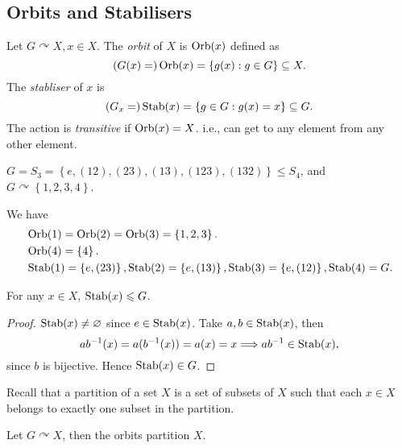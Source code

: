 \documentclass[a4paper]{article}
\begin{document}
        \subsection{Orbits and Stabilisers}
        \begin{definition}
            Let $ G \curvearrowright X, x\in X $. The \textit{orbit} of $X$ is $ \operatorname{Orb}(x) $ defined as 
            \[
                (G(x)=)\operatorname{Orb}(x)=\left\{ g(x):g\in G\right\} \subseteq X
            .\]
            The \textit{stabliser} of $x$ is 
            \[
                (G_x=)\operatorname{Stab}(x)=\left\{ g\in G: g(x)=x\right\} \subseteq G
            .\]
            The action is \textit{transitive} if $ \operatorname{Orb}(x)=X $. i.e., can get to any element from any other element.
        \end{definition}
        \begin{example}
            $ G=S_3=\left\{ e,(12),(23),(13),(123),(132)\right\}\le S_4 $, and $ G \curvearrowright \left\{ 1,2,3,4\right\} $.

            We have
            \[
                \begin{aligned}
                    &\operatorname{Orb}(1)=\operatorname{Orb}(2)=\operatorname{Orb}(3)=\left\{ 1,2,3\right\}.\\
                    &\operatorname{Orb}(4)=\left\{ 4\right\}.\\
                    &\operatorname{Stab}(1)=\left\{ e,(23)\right\},
                    \operatorname{Stab}(2)=\left\{ e,(13)\right\},
                    \operatorname{Stab}(3)=\left\{ e,(12)\right\},
                    \operatorname{Stab}(4)=G.
                \end{aligned}
            \]
        \end{example}
        \begin{lemma}\label{lma:5.9}
            For any $ x\in X $, $ \operatorname{Stab}(x) \leqslant G$. 
        \end{lemma}
        \begin{proof}
            $ \operatorname{Stab}(x)\neq \varnothing $ since $ e\in \operatorname{Stab}(x) $. Take $ a,b\in \operatorname{Stab}(x) $, then 
            \[
                ab^{-1}(x)=a(b^{-1}(x))=a(x)=x \Longrightarrow ab^{-1}\in \operatorname{Stab}(x)
            ,\]
            since $b$ is bijective. Hence $ \operatorname{Stab}(x)\in G $.
        \end{proof}
        Recall that a partition of a set $X$ is a set of subsets of $X$ such that each $x\in X$ belongs to exactly one subset in the partition.
        \begin{lemma}\label{lma:5.10}
            Let $ G \curvearrowright X $, then the orbits partition $X$.
        \end{lemma}
\end{document}
